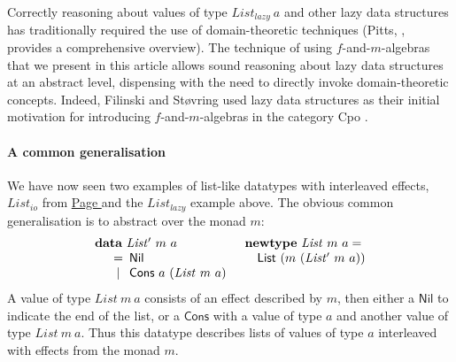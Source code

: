 \documentclass{jfp1}
\newcommand{\kw}[1]{\textbf{#1}}
\begin{document}
Correctly reasoning about values of type $\mathit{List_{lazy}}~a$ and
other lazy data structures has traditionally required the use of
domain-theoretic techniques (Pitts, \cite{pitts96relational}, provides
a comprehensive overview). The technique of using $f$-and-$m$-algebras
that we present in this article allows sound reasoning about lazy data
structures at an abstract level, dispensing with the need to directly
invoke domain-theoretic concepts. Indeed, Filinski and St\o{}vring
used lazy data structures as their initial motivation for introducing
$f$-and-$m$-algebras in the category Cpo \cite{filinski07inductive}.

\paragraph{A common generalisation} We have now seen two examples of
list-like datatypes with interleaved effects, $\mathit{List_{io}}$
from \hyperref[defn:listio]{Page \pageref*{defn:listio}} and the
$\mathit{List_{lazy}}$ example above. The obvious common
generalisation is to abstract over the monad $m$:
\begin{displaymath}
  \begin{array}{ll}
    \kw{data}~\mathit{List'}~m~a
    &
    \kw{newtype}~\mathit{List}~m~a = 
    \\
    \quad
    \begin{array}[t]{c@{\hspace{0.5em}}l}
      = & \mathsf{Nil} \\
      | & \mathsf{Cons}~a~(\mathit{List}~m~a) \\
    \end{array}
    &
    \quad \mathsf{List}~(m~(\mathit{List'}~m~a))
  \end{array}
\end{displaymath}
A value of type $\mathit{List}~m~a$ consists of an effect described by
$m$, then either a $\mathsf{Nil}$ to indicate the end of the list,
or a $\mathsf{Cons}$ with a value of type $a$ and another value of
type $\mathit{List}~m~a$. Thus this datatype describes lists of values
of type $a$ interleaved with effects from the monad $m$.
\end{document}
